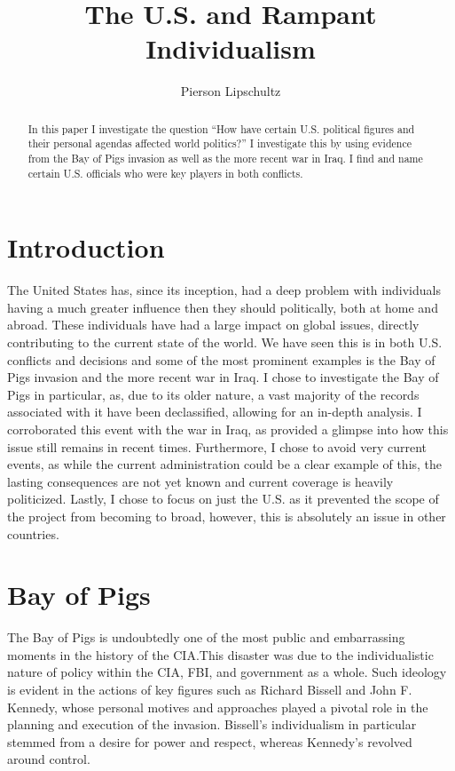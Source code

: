 \documentclass[12pt, twoside]{article}
\title{The U.S. and Rampant Individualism }
\author{Pierson Lipschultz}
\begin{document}
\maketitle

\begin{abstract}
    In this paper I investigate the question ``How have certain U.S. political figures and their personal agendas affected world politics?'' I investigate this by using evidence from the Bay of Pigs invasion as well as the more recent war in Iraq. I find and name certain U.S. officials who were key players in both conflicts.
\end{abstract}

\section{Introduction}

    The United States has, since its inception, had a deep problem with individuals having a much greater influence then they should politically, both at home and abroad. These individuals have had a large impact on global issues, directly contributing to the current state of the world. We have seen this is in both U.S. conflicts and decisions and some of the most prominent examples is the Bay of Pigs invasion and the more recent war in Iraq. I chose to investigate the Bay of Pigs in particular, as, due to its older nature, a vast majority of the records associated with it have been declassified, allowing for an in-depth analysis. I corroborated this event with the war in Iraq, as provided a glimpse into how this issue still remains in recent times. Furthermore, I chose to avoid very current events, as while the current administration could be a clear example of this, the lasting consequences are not yet known and current coverage is heavily politicized. Lastly, I chose to focus on just the U.S. as it prevented the scope of the project from becoming to broad, however, this is absolutely an issue in other countries.

\section{Bay of Pigs}

    The Bay of Pigs is undoubtedly one of the most public and embarrassing moments in the history of the CIA.\@ This disaster was due to the individualistic nature of policy within the CIA, FBI, and government as a whole. Such ideology is evident in the actions of key figures such as Richard Bissell and John F. Kennedy, whose personal motives and approaches played a pivotal role in the planning and execution of the invasion. Bissell's individualism in particular stemmed from a desire for power and respect, whereas Kennedy's revolved around control.~\parencite{JeffreysJones2003}
\end{document}
